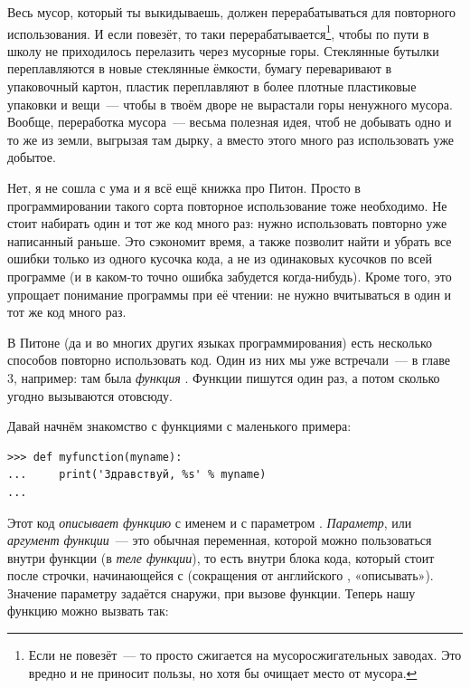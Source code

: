 Весь мусор, который ты выкидываешь, должен перерабатываться для повторного использования. И если повезёт, то таки перерабатывается\footnote{Если не повезёт — то просто сжигается на мусоросжигательных заводах. Это вредно и не приносит пользы, но хотя бы очищает место от мусора.}, чтобы по пути в школу не приходилось перелазить через мусорные горы. Стеклянные бутылки переплавляются в новые стеклянные ёмкости, бумагу переваривают в упаковочный картон, пластик переплавляют в более плотные пластиковые упаковки и вещи — чтобы в твоём дворе не вырастали горы ненужного мусора. Вообще, переработка мусора — весьма полезная идея, чтоб не добывать одно и то же из земли, выгрызая там дырку, а вместо этого много раз использовать уже добытое.

Нет, я не сошла с ума и я всё ещё книжка про Питон. Просто в программировании такого сорта повторное использование тоже необходимо. Не стоит набирать один и тот же код много раз: нужно использовать повторно уже написанный раньше. Это сэкономит время, а также позволит найти и убрать все ошибки только из одного кусочка кода, а не из одинаковых кусочков по всей программе (и в каком-то точно ошибка забудется когда-нибудь). Кроме того, это упрощает понимание программы при её чтении: не нужно вчитываться в один и тот же код много раз.

В Питоне (да и во многих других языках программирования) есть несколько способов повторно использовать код. Один из них мы уже встречали — в главе 3, например: там была \emph{функция} . Функции пишутся один раз, а потом сколько угодно вызываются отовсюду.

Давай начнём знакомство с функциями с маленького примера:

\begin{listing}
\begin{verbatim}
>>> def myfunction(myname):
...     print('Здравствуй, %s' % myname)
...
\end{verbatim}
\end{listing}

Этот код \emph{описывает функцию} с именем  и с параметром . \emph{Параметр}, или \emph{аргумент функции} — это обычная переменная, которой можно пользоваться внутри функции (в \emph{теле функции}), то есть внутри блока кода, который стоит после строчки, начинающейся с  (сокращения от английского , «описывать»). Значение параметру задаётся снаружи, при вызове функции. Теперь нашу функцию можно вызвать так:


